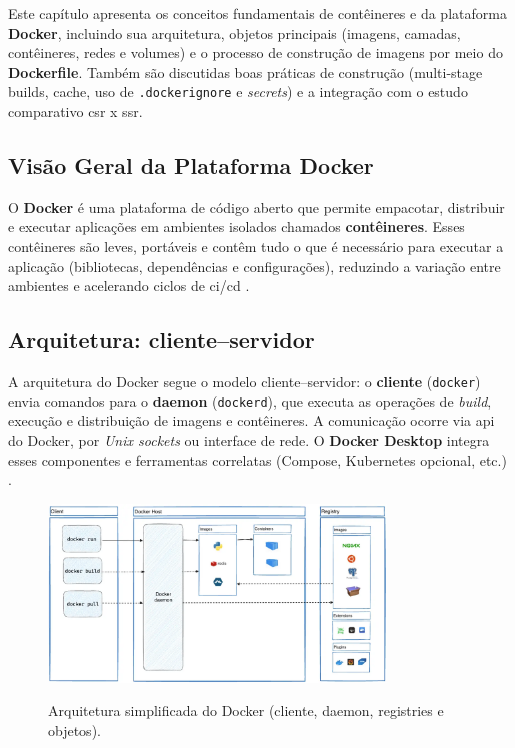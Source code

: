 Este capítulo apresenta os conceitos fundamentais de contêineres e da plataforma \textbf{Docker}, incluindo sua arquitetura, objetos principais (imagens, camadas, contêineres, redes e volumes) e o processo de construção de imagens por meio do \textbf{Dockerfile}. Também são discutidas boas práticas de construção (multi-stage builds, cache, uso de \texttt{.dockerignore} e \textit{secrets}) e a integração com o estudo comparativo \acrshort{csr} x \acrshort{ssr}. \cite{docker_overview,dockerfile_ref} 

\subsection{Visão Geral da Plataforma Docker}
\label{sec:docker-overview}

O \textbf{Docker} é uma plataforma de código aberto que permite empacotar, distribuir e executar aplicações em ambientes isolados chamados \textbf{contêineres}. Esses contêineres são leves, portáveis e contêm tudo o que é necessário para executar a aplicação (bibliotecas, dependências e configurações), reduzindo a variação entre ambientes e acelerando ciclos de \acrshort{ci}/\acrshort{cd} \cite{docker_overview}. 

\subsection{Arquitetura: cliente–servidor}
\label{subsec:docker-arquitetura}

A arquitetura do Docker segue o modelo cliente–servidor: o \textbf{cliente} (\texttt{docker}) envia comandos para o \textbf{daemon} (\texttt{dockerd}), que executa as operações de \textit{build}, execução e distribuição de imagens e contêineres. A comunicação ocorre via \acrshort{api} do Docker, por \textit{Unix sockets} ou interface de rede. O \textbf{Docker Desktop} integra esses componentes e ferramentas correlatas (Compose, Kubernetes opcional, etc.) \cite{docker_overview}. 

\begin{figure}[H]
  \centering
  \caption{Arquitetura simplificada do Docker (cliente, daemon, registries e objetos).}
  \includegraphics[width=0.8\textwidth]{media/docker_architecture.png}
  \label{fig:docker-arquitetura}
\end{figure}

